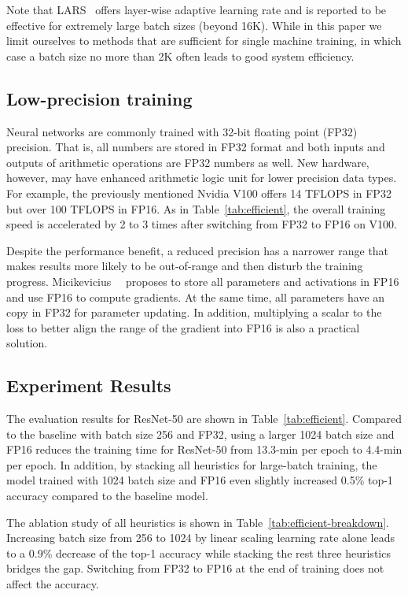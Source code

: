 \documentclass[10pt,twocolumn,letterpaper]{article}
\begin{document}
Note that LARS~\cite{ginsburg2018large} offers layer-wise adaptive learning rate and is reported to be effective for extremely large batch sizes (beyond 16K). While in this paper we limit ourselves to methods that are sufficient for single machine training, in which case a batch size no more than 2K often leads to good system efficiency.

\subsection{Low-precision training}

Neural networks are commonly trained with 32-bit floating point (FP32) precision. That is, all numbers are stored in FP32 format and both inputs and outputs of arithmetic operations are FP32 numbers as well. New hardware, however, may have enhanced arithmetic logic unit for lower precision data types. For example, the previously mentioned Nvidia V100 offers 14 TFLOPS in FP32 but over 100 TFLOPS in FP16. As in Table~\ref{tab:efficient}, the overall training speed is accelerated by 2 to 3 times after switching from FP32 to FP16 on V100.

Despite the performance benefit, a reduced precision has a narrower range that makes results more likely to be out-of-range and then disturb the training progress. Micikevicius~\etal~\cite{micikevicius2017mixed} proposes to store all parameters and activations in FP16 and use FP16 to compute gradients. At the same time, all parameters have an copy in FP32 for parameter updating. In addition, multiplying a scalar to the loss to better align the range of the gradient into FP16 is also a practical solution.


\subsection{Experiment Results}

The evaluation results for ResNet-50 are shown in
Table~\ref{tab:efficient}. Compared to the baseline with batch size 256 and
FP32, using a larger 1024 batch size and FP16 reduces the training time for ResNet-50 
from 13.3-min per epoch to 4.4-min per epoch. In addition, by stacking all heuristics
for large-batch training, the model trained with 1024 batch size and FP16 even
slightly increased 0.5\% top-1 accuracy compared to the baseline model.

The ablation study of all heuristics is shown in
Table~\ref{tab:efficient-breakdown}. Increasing batch size from
256 to 1024 by linear scaling learning rate alone leads to a 0.9\% decrease
of the top-1 accuracy while stacking the rest three heuristics bridges the gap.
Switching from FP32 to FP16 at the end of training does not affect the accuracy.
\end{document}
